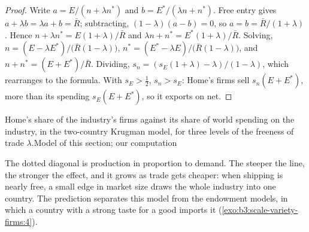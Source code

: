 \begin{proof}
Write $a = E/(n + \lambda n^*)$ and $b = E^*/(\lambda n + n^*)$. Free entry gives $a + \lambda b =
\lambda a + b = \bar R$; subtracting, $(1 - \lambda)(a - b) = 0$, so $a = b = \bar R/(1 + \lambda)$.
Hence $n + \lambda n^* = E(1 + \lambda)/\bar R$ and $\lambda n + n^* = E^*(1 + \lambda)/\bar R$. Solving,
$n = (E - \lambda E^*)/\bigl(\bar R(1 - \lambda)\bigr)$, $n^* = (E^* - \lambda E)/\bigl(\bar R(1 -
\lambda)\bigr)$, and $n + n^* = (E + E^*)/\bar R$. Dividing, $s_n = (s_E(1 + \lambda) - \lambda)/(1
- \lambda)$, which rearranges to the formula. With $s_E > \frac12$, $s_n > s_E$: Home's firms
sell $s_n(E + E^*)$, more than its spending $s_E(E + E^*)$, so it exports on net.
\end{proof}

\begin{omchart}{Home's share of the industry's firms against its share of
world spending on the industry, in the two-country Krugman model, for three
levels of the freeness of trade $\lambda$.}{Model of this section; our computation}
\end{omchart}

The dotted diagonal is production in proportion to demand. The steeper the line,
the stronger the effect, and it grows as trade gets cheaper: when shipping is
nearly free, a small edge in market size draws the whole industry into one
country. The prediction separates this model from the endowment models, in which
a country with a strong taste for a good imports it
(\cref{exo:b3:scale-variety-firms:4}).

